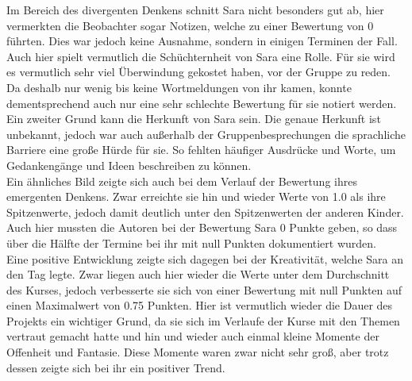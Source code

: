 Im Bereich des divergenten Denkens schnitt Sara nicht besonders gut ab, hier vermerkten die Beobachter sogar Notizen, welche zu einer Bewertung von 0 führten. Dies war jedoch keine Ausnahme, sondern in einigen Terminen der Fall. Auch hier spielt vermutlich die Schüchternheit von Sara eine Rolle. Für sie wird es vermutlich sehr viel Überwindung gekostet haben, vor der Gruppe zu reden. Da deshalb nur wenig bis keine Wortmeldungen von ihr kamen, konnte dementsprechend auch nur eine sehr schlechte Bewertung für sie notiert werden. Ein zweiter Grund kann die Herkunft von Sara sein. Die genaue Herkunft ist unbekannt, jedoch war auch außerhalb der Gruppenbesprechungen die sprachliche Barriere eine große Hürde für sie. So fehlten häufiger Ausdrücke und Worte, um Gedankengänge und Ideen beschreiben zu können.\\
Ein ähnliches Bild zeigte sich auch bei dem Verlauf der Bewertung ihres emergenten Denkens. Zwar erreichte sie hin und wieder Werte von 1.0 als ihre Spitzenwerte, jedoch damit deutlich unter den Spitzenwerten der anderen Kinder. Auch hier mussten die Autoren bei der Bewertung Sara 0 Punkte geben, so dass über die Hälfte der Termine bei ihr mit null Punkten dokumentiert wurden.\\
Eine positive Entwicklung zeigte sich dagegen bei der Kreativität, welche Sara an den Tag legte. Zwar liegen auch hier wieder die Werte unter dem Durchschnitt des Kurses, jedoch verbesserte sie sich von einer Bewertung mit null Punkten auf einen Maximalwert von 0.75 Punkten. Hier ist vermutlich wieder die Dauer des Projekts ein wichtiger Grund, da sie sich im Verlaufe der Kurse mit den Themen vertraut gemacht hatte und hin und wieder auch einmal kleine Momente der Offenheit und Fantasie. Diese Momente waren zwar nicht sehr groß, aber trotz dessen zeigte sich bei ihr ein positiver Trend.

